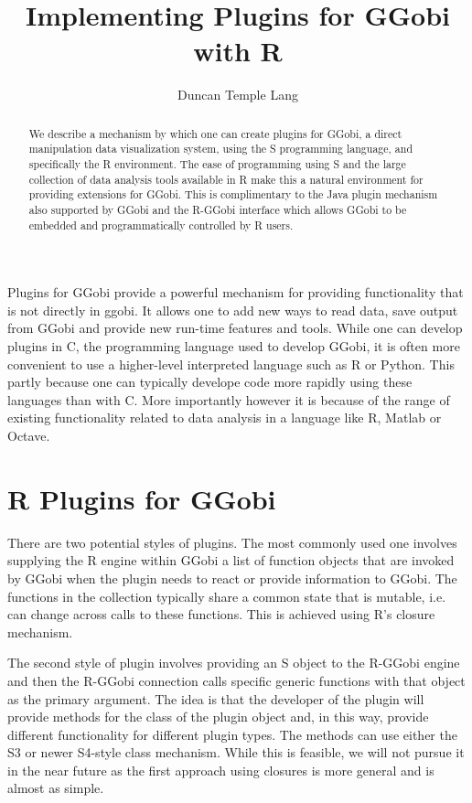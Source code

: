 \documentclass{article}
\author{Duncan Temple Lang}
\title{Implementing Plugins for GGobi with R}
\begin{document}
\maketitle

\begin{abstract}

  We describe a mechanism by which one can create plugins for GGobi, a
  direct manipulation data visualization system, using the S
  programming language, and specifically the R environment.  
  The ease of programming using S and the large collection of 
  data analysis tools available in R make this a natural
  environment for providing extensions for GGobi. This is
  complimentary to the Java plugin mechanism also supported by GGobi
  and the R-GGobi interface which allows GGobi to be embedded and 
  programmatically controlled by R users.

\end{abstract}

Plugins for GGobi provide a powerful mechanism for providing
functionality that is not directly in ggobi.  It allows one to add new
ways to read data, save output from GGobi and provide new run-time
features and tools.  While one can develop plugins in C, the
programming language used to develop GGobi, it is often more
convenient to use a higher-level interpreted language such as R or
Python.  This partly because one can typically develope code more
rapidly using these languages than with C.  More importantly however
it is because of the range of existing functionality related to data
analysis in a language like R, Matlab or Octave.


\section{R Plugins for GGobi}
There are two potential styles of plugins.  The most commonly used one
involves supplying the R engine within GGobi a list of function
objects that are invoked by GGobi when the plugin needs to react or
provide information to GGobi.  The functions in the collection
typically share a common state that is mutable, i.e. can change across
calls to these functions.  This is achieved using R's closure
mechanism.

The second style of plugin involves providing an S object to the
R-GGobi engine and then the R-GGobi connection calls specific generic
functions with that object as the primary argument.  The idea is that
the developer of the plugin will provide methods for the class of the
plugin object and, in this way, provide different functionality for
different plugin types. The methods can use either the S3 or newer
S4-style class mechanism.  While this is feasible, we will not pursue
it in the near future as the first approach using closures is more
general and is almost as simple.
\end{document}
